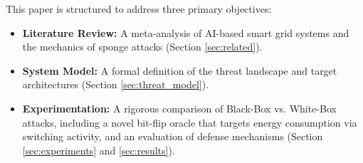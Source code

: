 This paper is structured to address three primary objectives:
\begin{itemize}
    \item \textbf{Literature Review:} A meta-analysis of AI-based smart grid systems and the mechanics of sponge attacks (Section \ref{sec:related}).
    \item \textbf{System Model:} A formal definition of the threat landscape and target architectures (Section \ref{sec:threat_model}).
    \item \textbf{Experimentation:} A rigorous comparison of Black-Box vs. White-Box attacks, including a novel bit-flip oracle that targets energy consumption via switching activity, and an evaluation of defense mechanisms (Section \ref{sec:experiments} and \ref{sec:results}).
\end{itemize}
